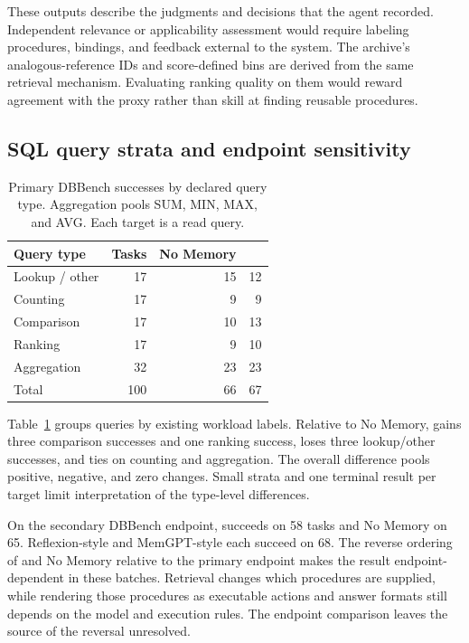 These outputs describe the judgments and decisions that the agent recorded. Independent relevance or applicability assessment would require labeling procedures, bindings, and feedback external to the system. The archive's analogous-reference IDs and score-defined bins are derived from the same retrieval mechanism. Evaluating ranking quality on them would reward agreement with the proxy rather than skill at finding reusable procedures.

\subsection{SQL query strata and endpoint sensitivity}
\label{sec:sql}
\begin{table}[t]
  \caption{Primary DBBench successes by declared query type. Aggregation pools SUM, MIN, MAX, and AVG. Each target is a read query.}
  \label{tab:strata}
  \begin{tabular*}{\columnwidth}{@{\extracolsep{\fill}}lrrr@{}}
    \toprule
    Query type & Tasks & No Memory & \SM{} \\
    \midrule
    Lookup / other & 17 & 15 & 12 \\
    Counting       & 17 & 9  & 9  \\
    Comparison     & 17 & 10 & 13 \\
    Ranking        & 17 & 9  & 10 \\
    Aggregation    & 32 & 23 & 23 \\
    \midrule
    Total          & 100 & 66 & 67 \\
    \bottomrule
  \end{tabular*}
\end{table}

Table~\ref{tab:strata} groups queries by existing workload labels. Relative to No Memory, \SM{} gains three comparison successes and one ranking success, loses three lookup/other successes, and ties on counting and aggregation. The overall difference pools positive, negative, and zero changes. Small strata and one terminal result per target limit interpretation of the type-level differences.

On the secondary DBBench endpoint, \SM{} succeeds on 58 tasks and No Memory on 65. Reflexion-style and MemGPT-style each succeed on 68. The reverse ordering of \SM{} and No Memory relative to the primary endpoint makes the result endpoint-dependent in these batches. Retrieval changes which procedures are supplied, while rendering those procedures as executable actions and answer formats still depends on the model and execution rules. The endpoint comparison leaves the source of the reversal unresolved.

